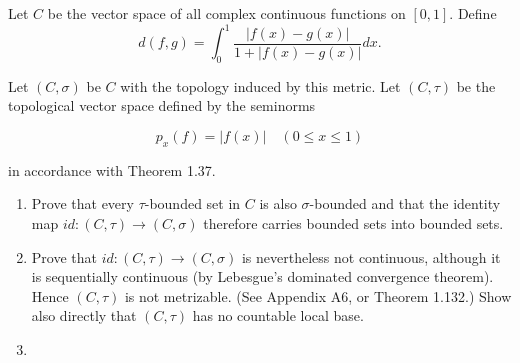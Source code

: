 Let $C$  be the vector space of all complex continuous functions on $[0,1]$. Define
$$
d(f,g)=\int_0^1\frac{|f(x)-g(x)|}{1+|f(x)-g(x)|}dx.
$$

Let $(C,\sigma)$ be $C$ with the topology induced by this metric. Let $(C,\tau)$ be the topological vector space defined by the seminorms

$$
p_x(f)=|f(x)| \quad (0\leq x \leq 1)
$$

in accordance with Theorem 1.37.

\begin{enumerate}
    \item Prove that every $\tau$-bounded set in $C$ is also $\sigma$-bounded and that the identity map $id: (C,\tau) \to (C,\sigma)$ therefore carries bounded sets into bounded sets.
    \item Prove that $id: (C,\tau) \to (C,\sigma)$ is nevertheless not continuous, although it is sequentially continuous (by Lebesgue's dominated convergence theorem). Hence $(C,\tau)$ is not metrizable. (See Appendix A6, or Theorem 1.132.) Show also directly that $(C,\tau)$ has no countable local base.
    \item 
\end{enumerate}